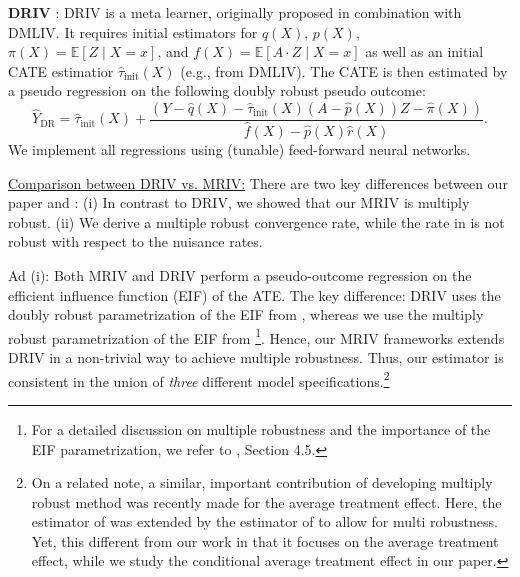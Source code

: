 \documentclass{article} %
\newcommand{\E}{\mathbb{E}}
\newcommand{\frameworkname}{MRIV\xspace}
\theoremstyle{definition}
\theoremstyle{plain}
\begin{document}
\textbf{DRIV} \citep{Syrgkanis.2019}: DRIV \citep{Syrgkanis.2019} is a meta learner, originally proposed in combination with DMLIV. It requires initial estimators for $q(X)$, $p(X)$, $\pi(X) = \E[Z \mid X = x]$, and $f(X) = \E[A \cdot Z \mid X = x]$ as well as an initial CATE estimatior $\hat{\tau}_{\mathrm{init}}(X)$ (e.g., from DMLIV). The CATE is then estimated by a pseudo regression on the following doubly robust pseudo outcome:
\begin{equation}
    \hat{Y}_{\mathrm{DR}} = \hat{\tau}_{\mathrm{init}}(X) + \frac{\left(Y - \hat{q}(X) - \hat{\tau}_{\mathrm{init}}(X) (A - \hat{p}(X)) Z - \hat{\pi}(X)\right)}{\hat{f}(X) - \hat{p}(X)\hat{r}(X)}.
\end{equation}
We implement all regressions using (tunable) feed-forward neural networks. 

\underline{Comparison between DRIV vs. \frameworkname:} There are two key differences between our paper and \citep{Syrgkanis.2019}: (i) In contrast to DRIV, we showed that our MRIV is multiply robust. (ii) We derive a multiple robust convergence rate, while the rate in \citep{Syrgkanis.2019} is not robust with respect to the nuisance rates.

Ad (i): Both MRIV and DRIV perform a pseudo-outcome regression on the efficient influence function (EIF) of the ATE. The key difference: DRIV uses the doubly robust parametrization of the EIF from \citep{Okui.2012}, whereas we use the multiply robust parametrization of the EIF from \citep{Wang.2018}\footnote{For a detailed discussion on multiple robustness and the importance of the EIF parametrization, we refer to \citep{Wang.2019}, Section 4.5.}. Hence, our MRIV frameworks extends DRIV in a non-trivial way to achieve multiple robustness. Thus, our estimator is consistent in the union of \emph{three} different model specifications.\footnote{On a related note, a similar, important contribution of developing multiply robust method was recently made for the average treatment effect. Here, the estimator of \citep{Okui.2012} was extended by the estimator of \citep{Wang.2018} to allow for multi robustness. Yet, this different from our work in that it focuses on the average treatment effect, while we study the conditional average treatment effect in our paper.}
\end{document}
